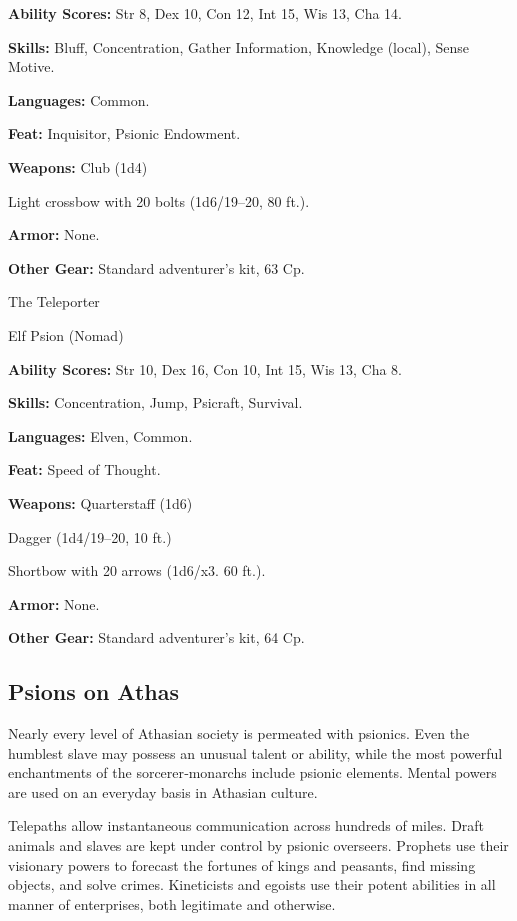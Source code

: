 \textbf{Ability Scores:} Str 8, Dex 10, Con 12, Int 15, Wis 13, Cha 14.

\textbf{Skills:} Bluff, Concentration, Gather Information, Knowledge (local), Sense Motive.

\textbf{Languages:} Common.

\textbf{Feat:} Inquisitor, Psionic Endowment.

\textbf{Weapons:} Club (1d4)

Light crossbow with 20 bolts (1d6/19–20, 80 ft.).

\textbf{Armor:} None.

\textbf{Other Gear:} Standard adventurer's kit, 63 Cp.

The Teleporter

Elf Psion (Nomad)

\textbf{Ability Scores:} Str 10, Dex 16, Con 10, Int 15, Wis 13, Cha 8.

\textbf{Skills:} Concentration, Jump, Psicraft, Survival.

\textbf{Languages:} Elven, Common.

\textbf{Feat:} Speed of Thought.

\textbf{Weapons:} Quarterstaff (1d6)

Dagger (1d4/19–20, 10 ft.)

Shortbow with 20 arrows (1d6/x3. 60 ft.).

\textbf{Armor:} None.

\textbf{Other Gear:} Standard adventurer's kit, 64 Cp.

\subsection{Psions on Athas}

Nearly every level of Athasian society is permeated with psionics. Even the humblest slave may possess an unusual talent or ability, while the most powerful enchantments of the sorcerer‐monarchs include psionic elements. Mental powers are used on an everyday basis in Athasian culture.

Telepaths allow instantaneous communication across hundreds of miles. Draft animals and slaves are kept under control by psionic overseers. Prophets use their visionary powers to forecast the fortunes of kings and peasants, find missing objects, and solve crimes. Kineticists and egoists use their potent abilities in all manner of enterprises, both legitimate and otherwise.

